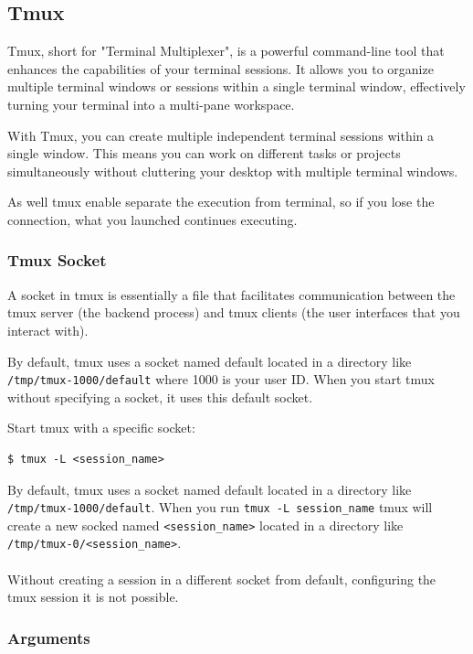\documentclass{article}
\newenvironment{blocktemplateII}[1]{%
    \tcolorbox[beamer,%
    noparskip,breakable,
    colframe=Green,%
    colbacklower=LimeGreen!75!LightGreen,%
    title=#1]}%
    {\endtcolorbox}
\newenvironment{codetemplate}[1][]{%
  \mybasecolorbox[#1]
  \itshape
}{%
  \endmybasecolorbox
}
\begin{document}
\subsection{Tmux}
Tmux, short for "Terminal Multiplexer", is a powerful command-line tool that enhances the capabilities of your terminal sessions. It allows you to organize multiple terminal windows or sessions within a single terminal window, effectively turning your terminal into a multi-pane workspace.

With Tmux, you can create multiple independent terminal sessions within a single window. This means you can work on different tasks or projects simultaneously without cluttering your desktop with multiple terminal windows.

As well tmux enable separate the execution from terminal, so if you lose the connection, what you launched continues executing.

\subsubsection{Tmux Socket}
A socket in tmux is essentially a file that facilitates communication between the tmux server (the backend process) and tmux clients (the user interfaces that you interact with).

By default, tmux uses a socket named default located in a directory like \verb|/tmp/tmux-1000/default| where 1000 is your user ID. When you start tmux without specifying a socket, it uses this default socket.

Start tmux with a specific socket:
\begin{codetemplate}
\begin{verbatim}
$ tmux -L <session_name>
\end{verbatim}
\end{codetemplate}

\begin{blocktemplateII}{Note}
By default, tmux uses a socket named default located in a directory like \verb|/tmp/tmux-1000/default|.
When you run \verb|tmux -L session_name| tmux will create a new socked named \verb|<session_name>| located in a directory like \verb|/tmp/tmux-0/<session_name>|.
\\\\
Without creating a session in a different socket from default, configuring the tmux session it is not possible. 
\end{blocktemplateII}


\subsubsection{Arguments}
\end{document}
